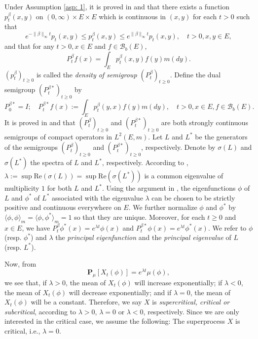 \documentclass[12pt, a4paper]{amsart}
\theoremstyle{definition}
\newenvironment{asp}[1]{\renewcommand\theinnerasp{#1}\innerasp}{\endinnerasp}
\numberwithin{equation}{section}
\begin{document}
	Under Assumption \ref{asp: 1}, it is proved in \cite{RenSongZhang2015Limit} and \cite{RenSongZhang2017Central} that there exists a function $p^\beta_t(x,y)$ on $(0,\infty) \times E \times E$ which is continuous in $(x,y)$ for each $t>0$ such that
\[
	e^{-\|\beta\|_\infty t} p_t(x,y)
	\leq p^{\beta}_t(x,y)
	\leq e^{\|\beta\|_\infty t} p_t(x,y),
	\quad t>0, x, y\in E,
\]
	and that for any $t>0, x\in E$ and $f \in \mathscr B_b(E)$,
\[
	P^\beta_t f(x)
	= \int_E p_t^\beta (x,y) f(y) m(dy).
\]
    $(p^\beta_t)_{t\geq 0}$ is called the \emph{density of semigroup $(P^\beta_t)_{t\geq 0}$}.
	Define the dual semigroup $(P^{\beta *}_t)_{t \geq 0}$ by
\[
	P^{\beta *}_0 = I;
	\quad P^{\beta *}_t f(x)
	:= \int_E p^\beta_t (y,x) f(y) m(dy),
	\quad t>0, x\in E, f\in \mathscr B_b(E).
\]
	It is proved in \cite{RenSongZhang2015Limit} and \cite{RenSongZhang2017Central} that
	$(P^\beta_t)_{t \geq 0}$ and $(P^{\beta *}_t)_{t \geq 0}$
	are both strongly continuous semigroups of compact operators in $L^2(E,m)$.
	Let $L$ and $L^*$ be the generators of the semigroups $(P^\beta_t)_{t \geq 0}$ and $(P^{\beta *}_t)_{t \geq 0}$, respectively.
	Denote by $\sigma(L)$ and $\sigma(L^*)$ the spectra of $L$ and $L^*$, respectively.
	According to \cite[Theorem V.6.6.]{Schaefer1974Banach}, $\lambda := \sup \text{Re}(\sigma(L)) = \sup \text{Re}(\sigma(L^*))$ is a common eigenvalue of multiplicity $1$ for both $L$ and $L^*$.
	Using the argument in \cite{RenSongZhang2015Limit}, the eigenfunctions $\phi$ of $L$ and $\phi^*$ of $L^*$ associated with the eigenvalue $\lambda$ can be chosen to be strictly positive and continuous everywhere on $E$.
	We further normalize $\phi$ and $\phi^*$ by $\langle\phi, \phi\rangle_m = \langle\phi,\phi^*\rangle_m = 1$ so that they are unique.
	Moreover, for each
	$t\geq 0$ and $x\in E$,
	we have $P^\beta_t \phi^*(x) = e^{\lambda t} \phi(x)$ and $P^{\beta *}_t \phi(x) = e^{\lambda t} \phi^*(x)$.
	We refer to $\phi$ (resp. $\phi^*$) and $\lambda$ the \emph{principal eigenfunction} and the \emph{principal eigenvalue} of $L$ (resp. $L^*$).
	
	Now, from
\[
	\mathbf P_\mu[X_t(\phi)]
   = e^{\lambda t} \mu(\phi),
\]
	we see that, if $\lambda > 0$, the mean of $X_t(\phi)$ will increase exponentially; if $\lambda < 0$, the mean of $X_t(\phi)$ will decrease exponentially; and if $\lambda = 0$, the mean of $X_t(\phi)$ will be a constant.
	Therefore, we say $X$ is \emph{supercritical, critical or subcritical}, according to $\lambda > 0$, $\lambda = 0$ or $\lambda < 0$, respectively.
	Since we are only interested in the critical case, we assume the following:
\begin{asp}{2} \label{asp: 2}
    The superprocess $X$ is critical, i.e., $\lambda = 0$.
\end{asp}
\end{document}
